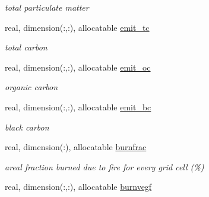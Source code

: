 \begin{DoxyCompactItemize}
\begin{DoxyCompactList}\small\item\em total particulate matter \end{DoxyCompactList}\item 
\hypertarget{structctem__statevars_1_1veg__gat_a0c2e89e81cbcf9915a719e6e10f390ac}{}real, dimension(\+:,\+:), allocatable \hyperlink{structctem__statevars_1_1veg__gat_a0c2e89e81cbcf9915a719e6e10f390ac}{emit\+\_\+tc}\label{structctem__statevars_1_1veg__gat_a0c2e89e81cbcf9915a719e6e10f390ac}

\begin{DoxyCompactList}\small\item\em total carbon \end{DoxyCompactList}\item 
\hypertarget{structctem__statevars_1_1veg__gat_a820ef83297d7de3c68fffa589db841f8}{}real, dimension(\+:,\+:), allocatable \hyperlink{structctem__statevars_1_1veg__gat_a820ef83297d7de3c68fffa589db841f8}{emit\+\_\+oc}\label{structctem__statevars_1_1veg__gat_a820ef83297d7de3c68fffa589db841f8}

\begin{DoxyCompactList}\small\item\em organic carbon \end{DoxyCompactList}\item 
\hypertarget{structctem__statevars_1_1veg__gat_a59a7d44154bb3a85668a84726a57709d}{}real, dimension(\+:,\+:), allocatable \hyperlink{structctem__statevars_1_1veg__gat_a59a7d44154bb3a85668a84726a57709d}{emit\+\_\+bc}\label{structctem__statevars_1_1veg__gat_a59a7d44154bb3a85668a84726a57709d}

\begin{DoxyCompactList}\small\item\em black carbon \end{DoxyCompactList}\item 
\hypertarget{structctem__statevars_1_1veg__gat_a1a311685a3cd4112ef9ca1ec166347fe}{}real, dimension(\+:), allocatable \hyperlink{structctem__statevars_1_1veg__gat_a1a311685a3cd4112ef9ca1ec166347fe}{burnfrac}\label{structctem__statevars_1_1veg__gat_a1a311685a3cd4112ef9ca1ec166347fe}

\begin{DoxyCompactList}\small\item\em areal fraction burned due to fire for every grid cell (\%) \end{DoxyCompactList}\item 
\hypertarget{structctem__statevars_1_1veg__gat_a93e2f6b40b49ca383377fc0093fba3a6}{}real, dimension(\+:,\+:), allocatable \hyperlink{structctem__statevars_1_1veg__gat_a93e2f6b40b49ca383377fc0093fba3a6}{burnvegf}\label{structctem__statevars_1_1veg__gat_a93e2f6b40b49ca383377fc0093fba3a6}


\end{DoxyCompactItemize}
